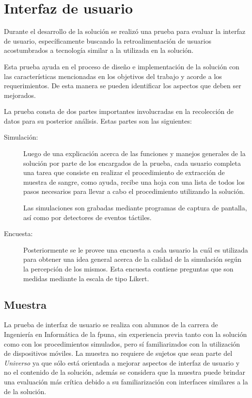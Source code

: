 
\section{Interfaz de usuario}
\label{sec:interfaz}

Durante el desarrollo de la solución se realizó una prueba para evaluar la 
interfaz de usuario, específicamente buscando la retroalimentación de usuarios 
acostumbrados a tecnología similar a la utilizada en la solución.

Esta prueba ayuda en el proceso de diseño e implementación de la solución con 
las características mencionadas en los objetivos del trabajo y acorde a los 
requerimientos. De esta manera se pueden identificar los aspectos que deben 
ser mejorados.

La prueba consta de dos partes importantes involucradas en la recolección
de datos para su posterior análisis. Estas partes son las siguientes:

\begin{description}

\item[Simulación:] Luego de una explicación acerca de las funciones y manejos
    generales de la solución por parte de los encargados de la prueba, cada usuario
    completa una tarea que consiste en realizar el procedimiento de extracción de 
    muestra de sangre, como ayuda, recibe una hoja con una lista de todos los pasos 
    necesarios para llevar a cabo el procedimiento utilizando la solución.
    	
    Las simulaciones son grabadas mediante programas de captura de pantalla, así
    como por detectores de eventos táctiles.
    	
\item[Encuesta:] Posteriormente se le provee una encuesta a cada
    usuario la cuál es utilizada para obtener una idea general acerca de la
    calidad de la simulación según la percepción de los mismos. Esta encuesta 
    contiene preguntas que son medidas mediante la escala de tipo Likert. 

\end{description} 

\subsection{Muestra}

La prueba de interfaz de usuario se realiza con alumnos de la carrera de
Ingeniería en Informática de la \Gls{fpuna}, sin experiencia previa tanto con la
solución como con los procedimientos simulados, pero sí familiarizados con la
utilización de dispositivos móviles. La muestra no requiere de sujetos que sean
parte del \emph{Universo} ya que sólo está
orientada a mejorar aspectos de interfaz de usuario y no el contenido de la
solución, además se considera que la muestra puede brindar una evaluación más
crítica debido a su familiarización con interfaces similares a la de la
solución.


